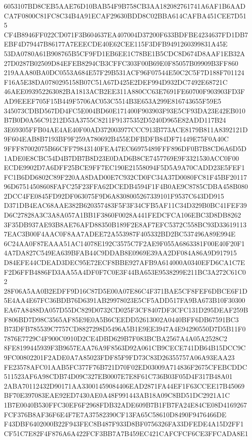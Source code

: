 \documentclass[UTF8,fontset=fandol,zihao=-4,a4paper]{ctexart}
\begin{document}
{{6053107BD8CEB5AAE76D10BAB54F9B758CB3AA182082761741A6AF1B6AADCA7F0800C81FC8C34B4A91ECAF29630BDD8C02BBA614CAFBA451CEE7D515
CF4B8946FF022CD071F3B604637EA407004D37200F633BDFBE4234637FD1DB7EBF4D79447B86177A7EEECDE40E62CEE115F3DFB9491260399831A45E
53DA0780A61B908765B5CF9FD1EB6EE1C78BE1B5CDC8D674D8AAF1EB32A27D0287B02509D84EFEB8294CB3CFFC303F00B69E0F85057B09909B3FF860
219AAA80BA0DC0553A684E57F29B531ACF96F07544E50C2C5F7D188F701124F16A5E38DA0780295158B07C51A67D425E2DEF994D932DC7492E68721C
46AEE093952263082BA1813ACB2EE311A880CC63E7691FE60700F903903FD3FAD9EEEF705F15B449F5706AC053C5514B3E653A299E816743655F59E5
345073CDBD567DD4FC5E004BD60E171400F903903F93E5CF93DA23E42EB010B7B0D0A56C91212D53A3755C8211F91375352D5240D965E82ADD117B24
3E69305FFB04AE4AE40F00AD372003977CCC913B773ACE8179B811A8392121D9F604EAB8B7193BF9F259A780692B455EDFBDFB84DF71449E75F0A40C
9FFF87002075B66CFF79843140FEA47EC66975489FFF896DF0B7B8CD6A6D5D1ADE0E8CBC54D4B7DB7B8D23E0DAD6B8CE7457769E9F3321530ACC0F00
ECDE9902D7A6DFF25BCE9FF7EC190E21558094F5D5A9A70CADD23E5FEF1FC1B6DD6802C89F220AA8DAD00E7C932CD0FC34A37D0080FC81F45BF20117
96D67514508608FAFC25F23FFA62DCEDB4594F1F4B0AE9C8785CDBA458B0802DCC4FE0845FD92DF063075F9D6A8308005267339101F9537C643DD915
D371DB4EAC68AAE382B620357483F5F3F34CFB5AF11C34D329B0BC41FEF39D6C27828A3C3A8A057A1BB1F3860F0028A441FEDCFCA106EBC3D8DB8262
3F35DB937AE93B8AE76AFD88350B189F2E8AF7EFC5372C558BC93D336191137EAC3B00F4AAC0F8AA7ADEE72A553987F405332BD2BC537496A89E994E
6C24AA0F87EAAA51AC14078E192C3575C7F2AE9F055A6863381F00E40F20F14A7DA827C549EA639BFAB44C9DDAB8E0969E39AA2DF084A86A9D917915
D84EFE44CDEAD3DEC95E72ECF8BBE927AFB9A614000A0340EFD6CA1C7EF2D6FFB4886FD3AA55A4DF0F7C0E3F44BA653E9538299E211BC3A272C61C02
28F06A5AA0B2EDFF9D16C87D5E00A07E86C4F371BAE5CF8FEF6DBCE6F1D5E4AA4E67FC36BDB76D6391AB29978023E5CF5ADD517FA9BA673B10F30300
EA67A8488DA057D55DC829D0732CD025F3CF8407DF3CFC131D295DEAF259BF806BD7D98C3565AF85E9E0A5B6CEEDD52613002A0440BFF6DB67591BC3
B73DFB785539C7757CD8827298D5496A5B1E9EE3947A4E94290550D7D5B11F07876E7729C4F900C0910D2CE4DBD629B7F083BCBA2567A4A05A2528C2
8FE8199445939F3B9657EAA76A9F8563D92A061CB9CECE741DB64B15DCC9C9FC00802201F2ADE0A7A85023FDF85F9FD73C83D26355757A06A93EAA23
FE23578AFC01AAB5FC377F76B721D70F02ED03009A714836F2675CFEBCDDC511523AF6A98CDB74D09C327EB0007E7E8F61C736B03F05D4F317B48A01
2ABA70112432D90171AA33001459084406EAD2871FA44EF1F63CCEE17B45069BF70E397083EAE92ED7430AE0A48F991443AB18A09C8BD51DC2921A1C
1B7E0040B530FFC30EF6F2968FDB32ADE609B7B1FB7FA24E84CE08D4169267FCF376B8AF36F6E4F7E7A37582390CF13FA65C58610D8490F9476466DE
F43DBF6402000B22F943FEC8B487F933D8BF0756326FA33DFEDE4A15D2FF1CF51C7E82F4F876A6A422FCF3BB7A7B459EC421CAFCFCF6CE3FFCADA8E1
}}
\end{document}

